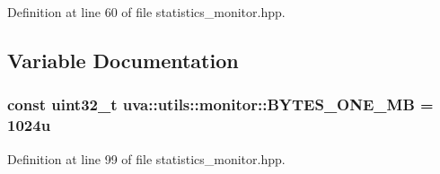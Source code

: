 Definition at line 60 of file statistics\+\_\+monitor.\+hpp.



\subsection{Variable Documentation}
\hypertarget{namespaceuva_1_1utils_1_1monitor_aae853f690eea0d25fcf5e288859a3c75}{}
\subsubsection[{B\+Y\+T\+E\+S\+\_\+\+O\+N\+E\+\_\+\+M\+B}]{\setlength{\rightskip}{0pt plus 5cm}const uint32\+\_\+t uva\+::utils\+::monitor\+::\+B\+Y\+T\+E\+S\+\_\+\+O\+N\+E\+\_\+\+M\+B = 1024u}\label{namespaceuva_1_1utils_1_1monitor_aae853f690eea0d25fcf5e288859a3c75}


Definition at line 99 of file statistics\+\_\+monitor.\+hpp.

